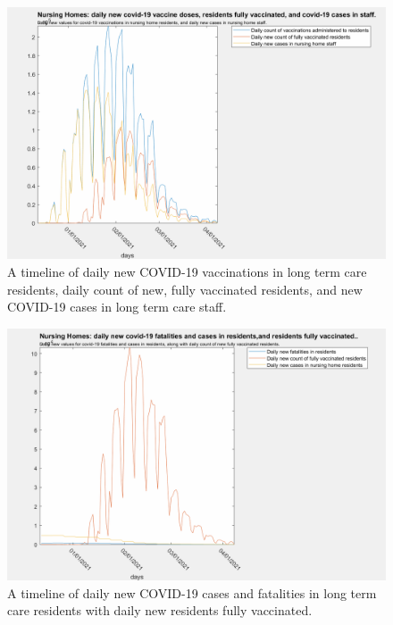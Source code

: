\documentclass[twoside]{article}
\begin{document}
\begin{multicols}{2}
\begin{figure}[H]
	\includegraphics[width=\linewidth]{images/ltc_fully_vaccinated.png}
	\caption{A timeline of daily new COVID-19 vaccinations in long term care residents, daily count of new, fully vaccinated residents, and new COVID-19 cases in long term care staff.  }
	\label{fig:images/ltc_fully_vaccinatedLabel}
\end{figure}

\begin{figure}[H]
	\includegraphics[width=\linewidth]{images/ltc_daily_cases.png}
	\caption{A timeline of daily new COVID-19 cases and fatalities in long term care residents with daily new residents fully vaccinated.}
	\label{fig:images/ltc_daily_casesLabel}
\end{figure}


\end{multicols}
\end{document}

